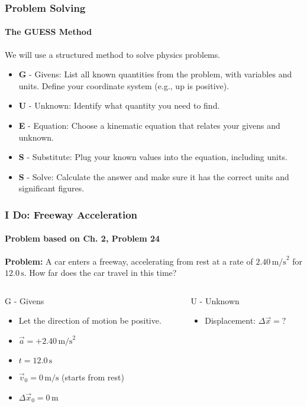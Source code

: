 \documentclass{beamer}
\begin{document}
\begin{frame}
\frametitle{Problem Solving}
\framesubtitle{The GUESS Method}
We will use a structured method to solve physics problems.
\begin{itemize}
    \item \textbf{G} - \alert{Givens}: List all known quantities from the problem, with variables and units. Define your coordinate system (e.g., up is positive).
    \item \textbf{U} - \alert{Unknown}: Identify what quantity you need to find.
    \item \textbf{E} - \alert{Equation}: Choose a kinematic equation that relates your givens and unknown.
    \item \textbf{S} - \alert{Substitute}: Plug your known values into the equation, including units.
    \item \textbf{S} - \alert{Solve}: Calculate the answer and make sure it has the correct units and significant figures.
\end{itemize}
\end{frame}

\begin{frame}
\frametitle{I Do: Freeway Acceleration}
\framesubtitle{Problem based on Ch. 2, Problem 24}
\textbf{Problem:} A car enters a freeway, accelerating from rest at a rate of $2.40 \, \text{m/s}^2$ for $12.0 \, \text{s}$. How far does the car travel in this time?

\begin{columns}[T]
    \begin{column}{0.5\textwidth}
        \begin{block}{G - Givens}
            \begin{itemize}
                \item Let the direction of motion be positive.
                \item $\vec{a} = +2.40 \, \text{m/s}^2$
                \item $t = 12.0 \, \text{s}$
                \item $\vec{v}_0 = 0 \, \text{m/s}$ (starts from rest)
                \item $\Delta \vec{x}_0 = 0 \, \text{m}$
            \end{itemize}
        \end{block}
    \end{column}
    \begin{column}{0.5\textwidth}
        \begin{block}{U - Unknown}
            \begin{itemize}
                \item Displacement: $\Delta \vec{x} = ?$
            \end{itemize}
        \end{block}
    \end{column}
\end{columns}

\end{frame}
\end{document}
